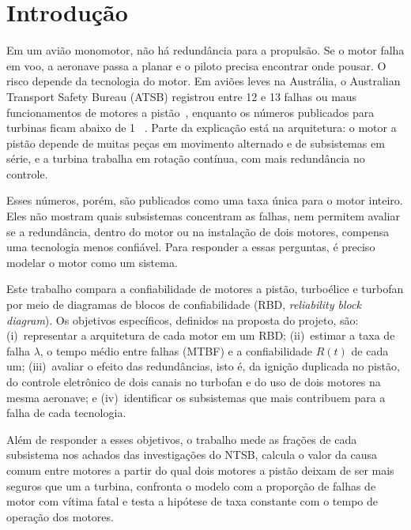 \section{Introdução}\label{sec:intro}

Em um avião monomotor, não há redundância para a propulsão.
Se o motor falha em voo, a aeronave passa a planar e o piloto precisa encontrar onde pousar.
O risco depende da tecnologia do motor.
Em aviões leves na Austrália, o Australian Transport Safety Bureau (ATSB) registrou entre 12 e 13 falhas ou maus funcionamentos \pcmh{} de motores a pistão~\cite{atsb2016}, enquanto os números publicados para turbinas ficam abaixo de 1 \pcmh{}~\cite{stobie2019,cfr25k,easa2017}.
Parte da explicação está na arquitetura: o motor a pistão depende de muitas peças em movimento alternado e de subsistemas em série, e a turbina trabalha em rotação contínua, com mais redundância no controle.

Esses números, porém, são publicados como uma taxa única para o motor inteiro.
Eles não mostram quais subsistemas concentram as falhas, nem permitem avaliar se a redundância, dentro do motor ou na instalação de dois motores, compensa uma tecnologia menos confiável.
Para responder a essas perguntas, é preciso modelar o motor como um sistema.

Este trabalho compara a confiabilidade de motores a pistão, turboélice e turbofan por meio de diagramas de blocos de confiabilidade (RBD, \emph{reliability block diagram}).
Os objetivos específicos, definidos na proposta do projeto, são:
(i)~representar a arquitetura de cada motor em um RBD;
(ii)~estimar a taxa de falha $\lambda$, o tempo médio entre falhas (MTBF) e a confiabilidade $R(t)$ de cada um;
(iii)~avaliar o efeito das redundâncias, isto é, da ignição duplicada no pistão, do controle eletrônico de dois canais no turbofan e do uso de dois motores na mesma aeronave;
e (iv)~identificar os subsistemas que mais contribuem para a falha de cada tecnologia.

Além de responder a esses objetivos, o trabalho mede as frações de cada subsistema nos achados das investigações do NTSB, calcula o valor da causa comum entre motores a partir do qual dois motores a pistão deixam de ser mais seguros que um a turbina, confronta o modelo com a proporção de falhas de motor com vítima fatal e testa a hipótese de taxa constante com o tempo de operação dos motores.
